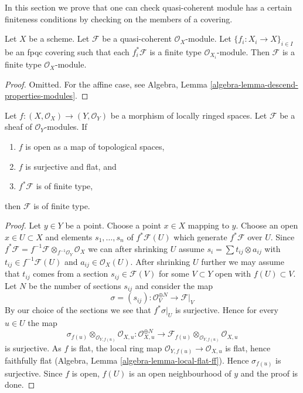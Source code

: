 \noindent
In this section we prove that one can check quasi-coherent module
has a certain finiteness conditions by checking on the members of
a covering.

\begin{lemma}
\label{lemma-finite-type-descends}
Let $X$ be a scheme.
Let $\mathcal{F}$ be a quasi-coherent $\mathcal{O}_X$-module.
Let $\{f_i : X_i \to X\}_{i \in I}$ be an fpqc covering such that
each $f_i^*\mathcal{F}$ is a finite type $\mathcal{O}_{X_i}$-module.
Then $\mathcal{F}$ is a finite type $\mathcal{O}_X$-module.
\end{lemma}

\begin{proof}
Omitted. For the affine case, see
Algebra, Lemma \ref{algebra-lemma-descend-properties-modules}.
\end{proof}

\begin{lemma}
\label{lemma-finite-type-descends-fppf}
Let $f : (X, \mathcal{O}_X) \to (Y, \mathcal{O}_Y)$ be a morphism of
locally ringed spaces. Let $\mathcal{F}$ be a sheaf of $\mathcal{O}_Y$-modules.
If
\begin{enumerate}
\item $f$ is open as a map of topological spaces,
\item $f$ is surjective and flat, and
\item $f^*\mathcal{F}$ is of finite type,
\end{enumerate}
then $\mathcal{F}$ is of finite type.
\end{lemma}

\begin{proof}
Let $y \in Y$ be a point. Choose a point $x \in X$ mapping to $y$.
Choose an open $x \in U \subset X$ and elements $s_1, \ldots, s_n$
of $f^*\mathcal{F}(U)$ which generate $f^*\mathcal{F}$ over $U$.
Since $f^*\mathcal{F} =
f^{-1}\mathcal{F} \otimes_{f^{-1}\mathcal{O}_Y} \mathcal{O}_X$
we can after shrinking $U$ assume $s_i = \sum t_{ij} \otimes a_{ij}$
with $t_{ij} \in f^{-1}\mathcal{F}(U)$ and $a_{ij} \in \mathcal{O}_X(U)$.
After shrinking $U$ further we may assume that $t_{ij}$ comes from
a section $s_{ij} \in \mathcal{F}(V)$ for some $V \subset Y$ open
with $f(U) \subset V$. Let $N$ be the number of sections $s_{ij}$ and
consider the map
$$
\sigma = (s_{ij}) : \mathcal{O}_V^{\oplus N} \to \mathcal{F}|_V
$$
By our choice of the sections we see that $f^*\sigma|_U$ is surjective.
Hence for every $u \in U$ the map
$$
\sigma_{f(u)} \otimes_{\mathcal{O}_{Y, f(u)}} \mathcal{O}_{X, u} :
\mathcal{O}_{X, u}^{\oplus N}
\longrightarrow
\mathcal{F}_{f(u)} \otimes_{\mathcal{O}_{Y, f(u)}} \mathcal{O}_{X, u}
$$
is surjective. As $f$ is flat, the local ring map
$\mathcal{O}_{Y, f(u)} \to \mathcal{O}_{X, u}$ is flat, hence
faithfully flat (Algebra, Lemma \ref{algebra-lemma-local-flat-ff}).
Hence $\sigma_{f(u)}$ is surjective. Since $f$ is open, $f(U)$ is
an open neighbourhood of $y$ and the proof is done.
\end{proof}

